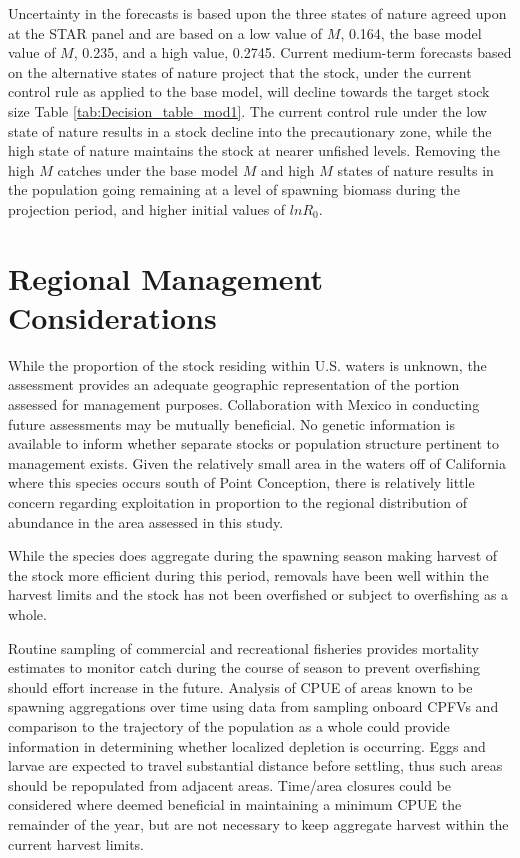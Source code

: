 \documentclass[12pt,]{article}
\begin{document}
Uncertainty in the forecasts is based upon the three states of nature
agreed upon at the STAR panel and are based on a low value of \(M\),
0.164, the base model value of \(M\), 0.235, and a high value, 0.2745.
Current medium-term forecasts based on the alternative states of nature
project that the stock, under the current control rule as applied to the
base model, will decline towards the target stock size Table
\ref{tab:Decision_table_mod1}. The current control rule under the low
state of nature results in a stock decline into the precautionary zone,
while the high state of nature maintains the stock at nearer unfished
levels. Removing the high \(M\) catches under the base model \(M\) and
high \(M\) states of nature results in the population going remaining at
a level of spawning biomass during the projection period, and higher
initial values of \(lnR_0\).

\section{Regional Management
Considerations}\label{regional-management-considerations}

While the proportion of the stock residing within U.S. waters is
unknown, the assessment provides an adequate geographic representation
of the portion assessed for management purposes. Collaboration with
Mexico in conducting future assessments may be mutually beneficial. No
genetic information is available to inform whether separate stocks or
population structure pertinent to management exists. Given the
relatively small area in the waters off of California where this species
occurs south of Point Conception, there is relatively little concern
regarding exploitation in proportion to the regional distribution of
abundance in the area assessed in this study.

While the species does aggregate during the spawning season making
harvest of the stock more efficient during this period, removals have
been well within the harvest limits and the stock has not been
overfished or subject to overfishing as a whole.

Routine sampling of commercial and recreational fisheries provides
mortality estimates to monitor catch during the course of season to
prevent overfishing should effort increase in the future. Analysis of
CPUE of areas known to be spawning aggregations over time using data
from sampling onboard CPFVs and comparison to the trajectory of the
population as a whole could provide information in determining whether
localized depletion is occurring. Eggs and larvae are expected to travel
substantial distance before settling, thus such areas should be
repopulated from adjacent areas. Time/area closures could be considered
where deemed beneficial in maintaining a minimum CPUE the remainder of
the year, but are not necessary to keep aggregate harvest within the
current harvest limits.
\end{document}
